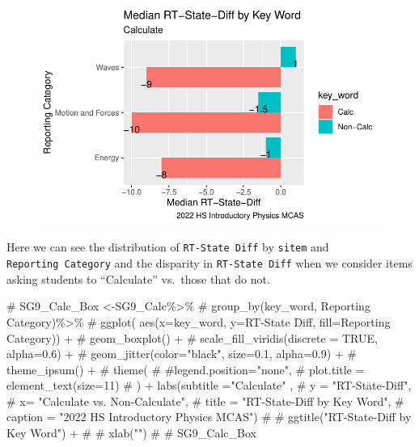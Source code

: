 \documentclass[
  letterpaper,
  DIV=11,
  numbers=noendperiod]{scrartcl}
\newenvironment{Shaded}{\begin{snugshade}}{\end{snugshade}}
\newcommand{\CommentTok}[1]{\textcolor[rgb]{0.37,0.37,0.37}{#1}}
\begin{document}
\begin{figure}[H]

{\centering \includegraphics{theresaSzczepanski_final_files/figure-pdf/unnamed-chunk-23-1.pdf}

}

\end{figure}

Here we can see the distribution of \texttt{RT-State\ Diff} by
\texttt{sitem} and \texttt{Reporting\ Category} and the disparity in
\texttt{RT-State\ Diff} when we consider items asking students to
``Calculate'' vs.~those that do not.

\begin{Shaded}
\begin{Highlighting}[]
\CommentTok{\# SG9\_Calc\_Box \textless{}{-}SG9\_Calc\%\textgreater{}\%}
\CommentTok{\#   group\_by(\textasciigrave{}key\_word\textasciigrave{}, \textasciigrave{}Reporting Category\textasciigrave{})\%\textgreater{}\%}
\CommentTok{\#   ggplot( aes(x=\textasciigrave{}key\_word\textasciigrave{}, y=\textasciigrave{}RT{-}State Diff\textasciigrave{}, fill=\textasciigrave{}Reporting Category\textasciigrave{})) +}
\CommentTok{\#     geom\_boxplot() +}
\CommentTok{\#     scale\_fill\_viridis(discrete = TRUE, alpha=0.6) +}
\CommentTok{\#     geom\_jitter(color="black", size=0.1, alpha=0.9) +}
\CommentTok{\#     theme\_ipsum() +}
\CommentTok{\#     theme(}
\CommentTok{\#       \#legend.position="none",}
\CommentTok{\#       plot.title = element\_text(size=11)}
\CommentTok{\#     ) + labs(subtitle ="Calculate" ,}
\CommentTok{\#        y = "RT{-}State{-}Diff",}
\CommentTok{\#        x= "Calculate vs. Non{-}Calculate",}
\CommentTok{\#        title = "RT{-}State{-}Diff by Key Word",}
\CommentTok{\#       caption = "2022 HS Introductory Physics MCAS")}
\CommentTok{\#    \# ggtitle("RT{-}State{-}Diff by Key Word") +}
\CommentTok{\#   \#  xlab("")}
\CommentTok{\# }
\CommentTok{\# SG9\_Calc\_Box}
\end{Highlighting}
\end{Shaded}
\end{document}
